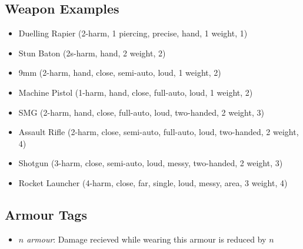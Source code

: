 \subsection{Weapon Examples}
\begin{itemize}
\item Duelling Rapier (2-harm, 1 piercing, precise, hand, 1 weight, 1\money)
\item Stun Baton (2s-harm, hand, 2 weight, 2\money)
\item 9mm (2-harm, hand, close, semi-auto, loud, 1 weight, 2\money)
\item Machine Pistol (1-harm, hand, close, full-auto, loud, 1 weight, 2\money)
\item SMG (2-harm, hand, close, full-auto, loud, two-handed, 2 weight, 3\money)
\item Assault Rifle (2-harm, close, semi-auto, full-auto, loud, two-handed, 2 weight, 4\money)
\item Shotgun (3-harm, close, semi-auto, loud, messy, two-handed, 2 weight, 3\money)
\item Rocket Launcher (4-harm, close, far, single, loud, messy, area, 3 weight, 4\money)
\end{itemize}

\subsection{Armour Tags}
\begin{itemize}
\item \textit{$n$ armour}: Damage recieved while wearing this armour is reduced by $n$
\end{itemize}